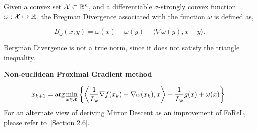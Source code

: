 \begin{definition}
	\label{def:bregman}
	Given a convex set $\mathcal{X} \subset \mathbb{R}^n$, and a differentiable $\sigma$-strongly convex function
	$\omega: \mathcal{X} \mapsto \mathbb{R}$, the Bregman Divergence associated with the function $\omega$ is defined
	as,

	$$ B_\omega(x, y) = \omega(x) - \omega(y) - \langle \nabla \omega(y), x-y
		\rangle.
	$$
\end{definition}

Bergman Divergence is not a true norm, since it does not satisfy the triangle inequality.

\textbf{Non-euclidean Proximal Gradient method}

\begin{equation}
	\label{eqn:noneucproxgrad}
	x_{k+1} = \arg \min_{x \in \mathcal{X}} \left \{ \left \langle \frac{1}{L_k} \nabla f(x_k) - \nabla \omega(x_k), x \right \rangle + \frac{1}{L_k} g(x) + \omega(x) \right \}.
\end{equation}
For an alternate view of deriving Mirror Descent as an improvement of FoReL, please refer
to~\cite{shalev-shwartzOnline2012}[Section 2.6].

